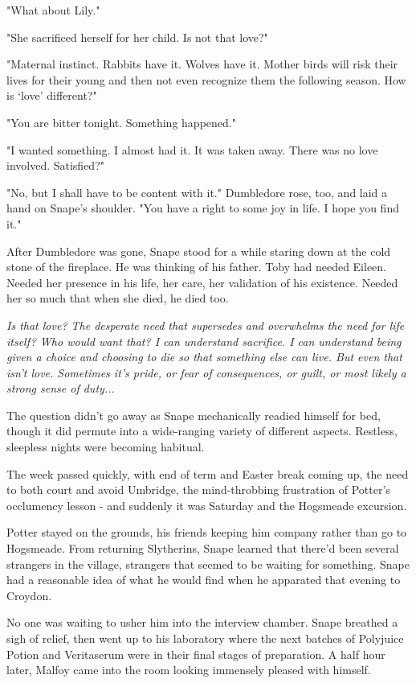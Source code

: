 "What about Lily."

"She sacrificed herself for her child. Is not that love?"

"Maternal instinct. Rabbits have it. Wolves have it. Mother birds will risk their lives for their young and then not even recognize them the following season. How is `love' different?"

"You are bitter tonight. Something happened."

"I wanted something. I almost had it. It was taken away. There was no love involved. Satisfied?"

"No, but I shall have to be content with it." Dumbledore rose, too, and laid a hand on Snape's shoulder. "You have a right to some joy in life. I hope you find it."

After Dumbledore was gone, Snape stood for a while staring down at the cold stone of the fireplace. He was thinking of his father. Toby had needed Eileen. Needed her presence in his life, her care, her validation of his existence. Needed her so much that when she died, he died too.

\emph{Is that love? The desperate need that supersedes and overwhelms the need for life itself? Who would want that? I can understand sacrifice. I can understand being given a choice and choosing to die so that something else can live. But even that isn't love. Sometimes it's pride, or fear of consequences, or guilt, or most likely a strong sense of duty...}

The question didn't go away as Snape mechanically readied himself for bed, though it did permute into a wide-ranging variety of different aspects. Restless, sleepless nights were becoming habitual.

The week passed quickly, with end of term and Easter break coming up, the need to both court and avoid Umbridge, the mind-throbbing frustration of Potter's occlumency lesson - and suddenly it was Saturday and the Hogsmeade excursion.

Potter stayed on the grounds, his friends keeping him company rather than go to Hogsmeade. From returning Slytherins, Snape learned that there'd been several strangers in the village, strangers that seemed to be waiting for something. Snape had a reasonable idea of what he would find when he apparated that evening to Croydon.

No one was waiting to usher him into the interview chamber. Snape breathed a sigh of relief, then went up to his laboratory where the next batches of Polyjuice Potion and Veritaserum were in their final stages of preparation. A half hour later, Malfoy came into the room looking immensely pleased with himself.

